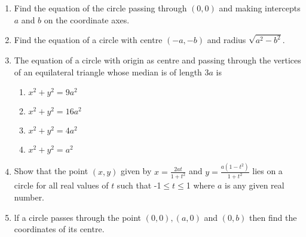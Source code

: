 \begin{enumerate}[label=\thesubsection.\arabic*,ref=\thesubsection.\theenumi]
  \item Find the equation of the circle passing through $(0,0)$ and making intercepts $a$ and $b$ on the coordinate axes.
  \item Find the equation of a circle with centre $(-a,-b)$ and radius $\sqrt{a^{2}-b^{2}}$.
	 \\
		\solution
\label{chapters/11/11/1/5}

\item The equation of a circle with origin as centre and passing through the vertices of an equilateral triangle whose median is of length $3 a$ is
\begin{enumerate}
\item $x^2+y^2=9a^2$
\item $x^2+y^2=16a^2$
\item $x^2+y^2=4a^2$
\item $x^2+y^2=a^2$
\end{enumerate}
 \item Show that the point $(x,y)$ given by $x=\frac{2at}{1+t^2}$ and $y=\frac{a(1-t^2)}{1+t^2}$ lies on a circle for all real values of $t$ such that -1$\le t \le $1 where $a$ is any given real number. 
 \item lf a circle passes through the point $(0,0), (a,0)$ and $(0,b)$ then find the coordinates of its centre.
\end{enumerate}
